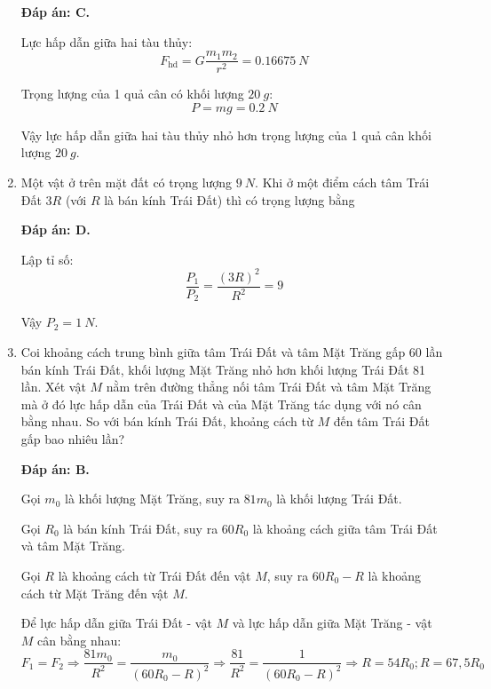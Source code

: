 \begin{enumerate}[label=\bfseries Câu \arabic*:]
	\loigiai
	{	\textbf{Đáp án: C.}
		
	Lực hấp dẫn giữa hai tàu thủy:
	$$F_\text{hd}=G\dfrac{m_1m_2}{r^2} = \SI{0.16675}{N}$$
	
	Trọng lượng của 1 quả cân có khối lượng $\SI{20}{g}$:
	$$P=mg=\SI{0.2}{N}$$
	
	Vậy lực hấp dẫn giữa hai tàu thủy nhỏ hơn trọng lượng của 1 quả cân khối lượng $\SI{20}{g}$.
	}
	
	\item {}
	
	\cauhoi
	{Một vật ở trên mặt đất có trọng lượng $\SI{9}{N}$. Khi ở một điểm cách tâm Trái Đất $3R$ (với $R$ là bán kính Trái Đất) thì có trọng lượng bằng
	}
	
	\loigiai
	{	\textbf{Đáp án: D.}	
		
Lập tỉ số:
$$\dfrac{P_1}{P_2} = \dfrac{(3R)^2}{R^2} = 9$$

Vậy $P_2 = \SI{1}{N}$.
	}

	\item {}
	
	\cauhoi
	{Coi khoảng cách trung bình giữa tâm Trái Đất và tâm Mặt Trăng gấp 60 lần bán kính Trái Đất, khối lượng Mặt Trăng nhỏ hơn khối lượng Trái Đất 81 lần. Xét vật $M$ nằm trên đường thẳng nối tâm Trái Đất và tâm Mặt Trăng mà ở đó lực hấp dẫn của Trái Đất và của Mặt Trăng tác dụng với nó cân bằng nhau. So với bán kính Trái Đất, khoảng cách từ $M$ đến tâm Trái Đất gấp bao nhiêu lần?
	}
	
	\loigiai
	{	\textbf{Đáp án: B.}
		
	Gọi $m_0$ là khối lượng Mặt Trăng, suy ra $81m_0$ là khối lượng Trái Đất.
	
	Gọi $R_0$ là bán kính Trái Đất, suy ra $60R_0$ là khoảng cách giữa tâm Trái Đất và tâm Mặt Trăng.
	
	Gọi $R$ là khoảng cách từ Trái Đất đến vật $M$, suy ra $60R_0 - R$ là khoảng cách từ Mặt Trăng đến vật $M$.
	
	Để lực hấp dẫn giữa Trái Đất - vật $M$ và lực hấp dẫn giữa Mặt Trăng - vật $M$ cân bằng nhau:
	$$F_1 = F_2 \Rightarrow \dfrac{81m_0}{R^2} = \dfrac{m_0}{(60R_0 - R)^2} \Rightarrow \dfrac{81}{R^2} = \dfrac{1}{(60R_0 - R)^2} \Rightarrow R=54 R_0; R=67,5 R_0$$
	}
	
	
\end{enumerate}


